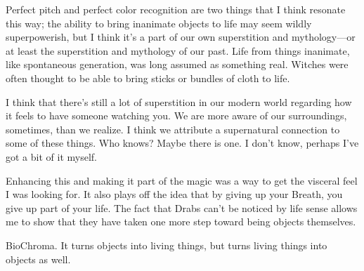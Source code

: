 Perfect pitch and perfect color recognition are two things that I think resonate this way; the ability to bring inanimate objects to life may seem wildly superpowerish, but I think it’s a part of our own superstition and mythology—or at least the superstition and mythology of our past. Life from things inanimate, like spontaneous generation, was long assumed as something real. Witches were often thought to be able to bring sticks or bundles of cloth to life.

I think that there’s still a lot of superstition in our modern world regarding how it feels to have someone watching you. We are more aware of our surroundings, sometimes, than we realize. I think we attribute a supernatural connection to some of these things. Who knows? Maybe there is one. I don’t know, perhaps I’ve got a bit of it myself.

Enhancing this and making it part of the magic was a way to get the visceral feel I was looking for. It also plays off the idea that by giving up your Breath, you give up part of your life. The fact that Drabs can’t be noticed by life sense allows me to show that they have taken one more step toward being objects themselves.

BioChroma. It turns objects into living things, but turns living things into objects as well.




